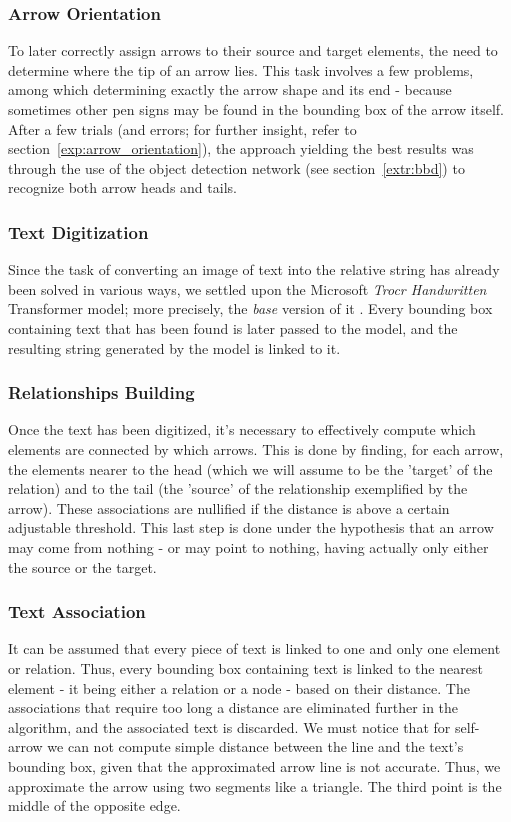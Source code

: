 \documentclass[conference]{IEEEtran}
\begin{document}
\subsubsection{Arrow Orientation}
To later correctly assign arrows to their source and target elements, the need to determine where the tip of an arrow lies. This task involves a few problems, among which determining exactly the arrow shape and its end - because sometimes other pen signs may be found in the bounding box of the arrow itself. After a few trials (and errors; for further insight, refer to section~\ref{exp:arrow_orientation}), the approach yielding the best results was through the use of the object detection network (see section~\ref{extr:bbd}) to recognize both arrow heads and tails. \\

\subsubsection{Text Digitization}
Since the task of converting an image of text into the relative string has already been solved in various ways, we settled upon the Microsoft \textit{Trocr Handwritten} Transformer model; more precisely, the \textit{base} version of it \cite{microsofttrocr}. Every bounding box containing text that has been found is later passed to the model, and the resulting string generated by the model is linked to it.\\

\subsubsection{Relationships Building}
Once the text has been digitized, it's necessary to effectively compute which elements are connected by which arrows. This is done by finding, for each arrow, the elements nearer to the head (which we will assume to be the 'target' of the relation) and to the tail (the 'source' of the relationship exemplified by the arrow). These associations are nullified if the distance is above a certain adjustable threshold. This last step is done under the hypothesis that an arrow may come from nothing - or may point to nothing, having actually only either the source or the target. \\

\subsubsection{Text Association}
It can be assumed that every piece of text is linked to one and only one element or relation. Thus, every bounding box containing text is linked to the nearest element - it being either a relation or a node - based on their distance. The associations that require too long a distance are eliminated further in the algorithm, and the associated text is discarded.
We must notice that for self-arrow we can not compute simple distance between the line and the text's bounding box, given that the approximated arrow line is not accurate. Thus, we approximate the arrow using two segments like a triangle.
The third point is the middle of the opposite edge. \\
\end{document}
